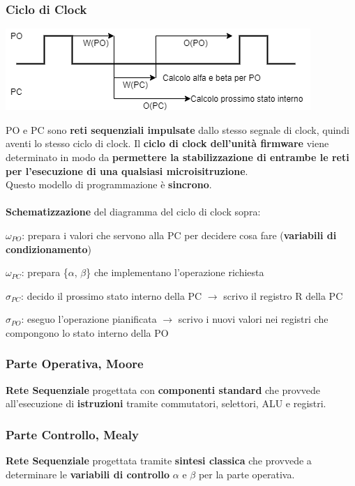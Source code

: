 \documentclass[10pt]{report}
\begin{document}
\subsubsection{Ciclo di Clock}
\begin{center}
\includegraphics[scale=1]{ufclock.png}
\end{center}
PO e PC sono \textbf{reti sequenziali impulsate} dallo stesso segnale di clock, quindi aventi lo stesso ciclo di clock. Il \textbf{ciclo di clock dell'unità firmware} viene determinato in modo da \textbf{permettere la stabilizzazione di entrambe le reti per l'esecuzione di una qualsiasi microisitruzione}.\\
Questo modello di programmazione è \textbf{sincrono}.\\\\
\textbf{Schematizzazione} del diagramma del ciclo di clock sopra:
\begin{list}{}{}
	\item $\omega_{PO}$: prepara i valori che servono alla PC per decidere cosa fare (\textbf{variabili di condizionamento})
	\item $\omega_{PC}$: prepara \{$\alpha$, $\beta$\} che implementano l'operazione richiesta
	\item $\sigma_{PC}$: decido il prossimo stato interno della PC $\rightarrow$ scrivo il registro R della PC
	\item $\sigma_{PO}$: eseguo l'operazione pianificata $\rightarrow$ scrivo i nuovi valori nei registri che compongono lo stato interno della PO
\end{list}
\subsubsection{Parte Operativa, Moore}
\textbf{Rete Sequenziale} progettata con \textbf{componenti standard} che provvede all'esecuzione di \textbf{istruzioni} tramite commutatori, selettori, ALU e registri.
\subsubsection{Parte Controllo, Mealy}
\textbf{Rete Sequenziale} progettata tramite \textbf{sintesi classica} che provvede a determinare le \textbf{variabili di controllo} $\alpha$ e $\beta$ per la parte operativa.
\end{document}
